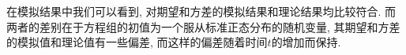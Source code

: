 \documentclass[notitlepage,cs4size,punct,oneside]{ctexrep}
\numberwithin{equation}{section}
\theoremstyle{mystyle}
\begin{document}
在模拟结果中我们可以看到, 对期望和方差的模拟结果和理论结果均比较符合. 而两者的差别在于方程组的初值为一个服从标准正态分布的随机变量, 其期望和方差的模拟值和理论值有一些偏差, 而这样的偏差随着时间$t$的增加而保持. \\









\end{document}
